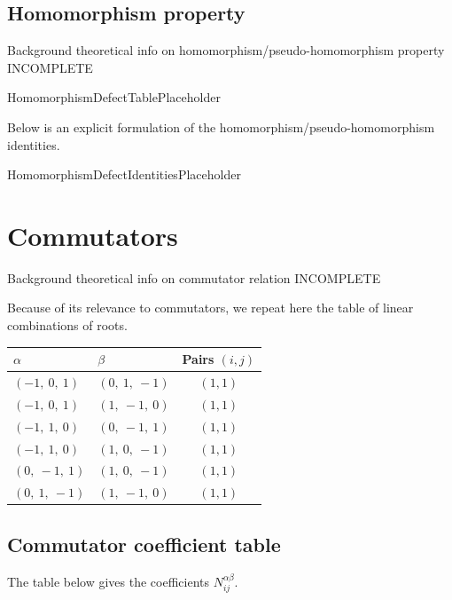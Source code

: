 \documentclass[11pt]{article}
\newcommand{\noi}{\noindent}
\theoremstyle{definition}
\begin{document}
\subsection{Homomorphism property}

\noi Background theoretical info on homomorphism/pseudo-homomorphism property INCOMPLETE

\bigskip

HomomorphismDefectTablePlaceholder

\noi Below is an explicit formulation of the homomorphism/pseudo-homomorphism identities.

\bigskip

HomomorphismDefectIdentitiesPlaceholder

\newpage
\section{Commutators}

\noi Background theoretical info on commutator relation INCOMPLETE

\noi Because of its relevance to commutators, we repeat here the table of linear combinations of roots.

\begin{tabular}{|l|l|c|}
    \hline
    $\alpha$ & $\beta$ & Pairs $(i,j)$ \\
    \hline
    $\left( -1, \  0, \  1\right)$ & $\left( 0, \  1, \  -1\right)$ & $(1,1)$ \\
    \hline
    $\left( -1, \  0, \  1\right)$ & $\left( 1, \  -1, \  0\right)$ & $(1,1)$ \\
    \hline
    $\left( -1, \  1, \  0\right)$ & $\left( 0, \  -1, \  1\right)$ & $(1,1)$ \\
    \hline
    $\left( -1, \  1, \  0\right)$ & $\left( 1, \  0, \  -1\right)$ & $(1,1)$ \\
    \hline
    $\left( 0, \  -1, \  1\right)$ & $\left( 1, \  0, \  -1\right)$ & $(1,1)$ \\
    \hline
    $\left( 0, \  1, \  -1\right)$ & $\left( 1, \  -1, \  0\right)$ & $(1,1)$ \\
    \hline
\end{tabular}


\subsection{Commutator coefficient table}

\noi The table below gives the coefficients $N_{ij}^{\alpha\beta}$.
\end{document}
